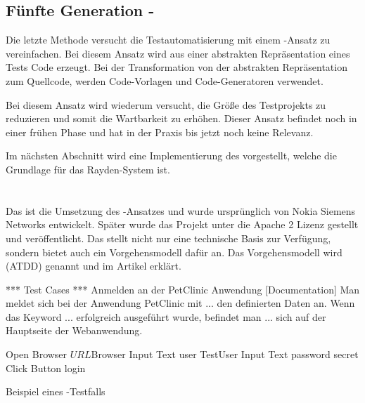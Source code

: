 \subsection{Fünfte Generation - }

Die letzte Methode versucht die Testautomatisierung mit einem -Ansatz zu vereinfachen. Bei diesem Ansatz wird aus einer abstrakten Repräsentation eines Tests Code erzeugt. Bei der Transformation von der abstrakten Repräsentation zum Quellcode, werden Code-Vorlagen und Code-Generatoren verwendet.

\SuperPar
Bei diesem Ansatz wird wiederum versucht, die Größe des Testprojekts zu reduzieren und somit die Wartbarkeit zu erhöhen. Dieser Ansatz befindet noch in einer frühen Phase und hat in der Praxis bis jetzt noch keine Relevanz. 

\SuperPar
Im nächsten Abschnitt wird eine Implementierung des  vorgestellt, welche die Grundlage für das Rayden-System ist.

\section{}

Das  \cite{Robot} ist die Umsetzung des -Ansatzes und wurde ursprünglich von Nokia Siemens Networks entwickelt. Später wurde das Projekt unter die Apache 2 Lizenz gestellt und veröffentlicht. Das  stellt nicht nur eine technische Basis zur Verfügung, sondern bietet auch ein Vorgehensmodell dafür an. Das Vorgehensmodell wird  (ATDD) genannt und im Artikel  \cite{Lar10} erklärt.

\begin{program}
\begin{JavaCode}
*** Test Cases ***
Anmelden an der PetClinic Anwendung
	[Documentation]	Man meldet sich bei der Anwendung PetClinic mit 
	...             den definierten Daten an. Wenn das Keyword 
	...             erfolgreich ausgeführt wurde, befindet man 
	...             sich auf der Hauptseite der Webanwendung.
	
	Open Browser	${URL}		${Browser}
	Input Text    user			TestUser
	Input Text		password	secret
	Click Button	login

\end{JavaCode}
\caption{Beispiel eines -Testfalls}
\label{prog:robotTestCase}
\end{program}

